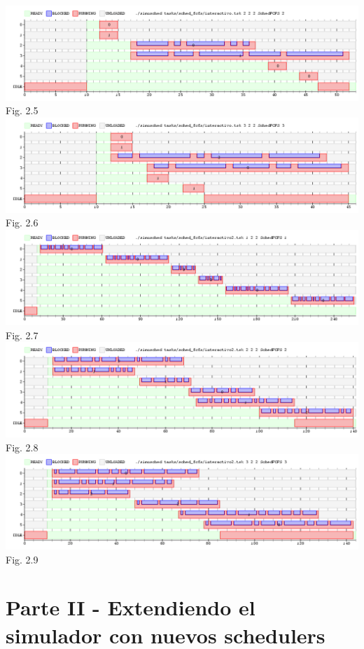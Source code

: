 \documentclass[a4paper]{article}
\begin{document}
\includegraphics [width=17cm]{../graficos/sched_fcfs/interactivo_2.png} {Fig. 2.5}
\includegraphics [width=17cm]{../graficos/sched_fcfs/interactivo_3.png} {Fig. 2.6}
\includegraphics [width=17cm]{../graficos/sched_fcfs/interactivo2.png} {Fig. 2.7}
\includegraphics [width=17cm]{../graficos/sched_fcfs/interactivo2_2.png} {Fig. 2.8}
\includegraphics [width=17cm]{../graficos/sched_fcfs/interactivo2_3.png} {Fig. 2.9}


\newpage
{}
\section{Parte II - Extendiendo el simulador con nuevos schedulers}
\end{document}
